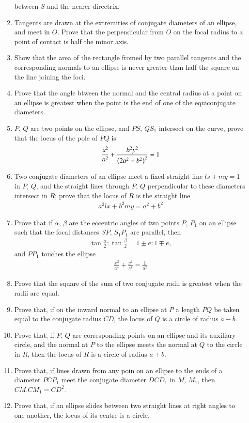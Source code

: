 \begin{enumerate}[label=\arabic*.,ref=\thesubsection.\theenumi]
between $S$ and the nearer directrix.
\item Tangents are drawn at the extremities of conjugate diameters of an ellipse, and meet in $O$.  Prove that the
perpendicular from $O$ on the focal radius to a point of contact is half the
minor axis.
\item Show that the area of the rectangle fromed by two parallel tangents and the corresponding
normals to an ellipse is never greater than half the square on the line joining the foci.
\item Prove that the angle btween the normal and the central radius at a point on an ellipse
is greatest when the point is the end of one of the equiconjugate diameters.
\item $P$, $Q$ are two points on the ellipse, and $PS$, $QS_1$ intersect on the curve, prove that the locus of the pole of $PQ$ is
\begin{align*}
\frac{x^2}{a^2}+\frac{b^2y^2}{\left(2a^2-b^2\right)^2} = 1
\end{align*}
\item Two conjugate diameters of an ellipse meet a fixed straight line $ls+my=1$ in $P$, $Q$, and the straight lines
through $P$, $Q$ perpendicular to these diameters intersect in $R$;  prove that the locus of
$R$ is the straight line
\begin{align*}
a^2lx + b^2my = a^2+b^2
\end{align*}
\item Prove that if $\alpha$, $\beta$ are the eccentric angles of two points $P$, $P_1$ on an ellipse such that
the focal distances $SP$, $S_1P_1$ are parallel, then 
\begin{align*}
\tan\frac{\alpha}{2}:\tan\frac{\beta}{2} = 1\pm e: 1\mp e,
\end{align*}
and $PP_1$ touches the ellipse
\begin{align*}
\frac{x^2}{a^4}+\frac{y^2}{b^4} = \frac{1}{a^2}
\end{align*}
\item Prove that the square of the sum of two conjugate radii is greatest when the radii are equal.
\item Prove that, if on the inward normal to an ellipse at $P$ a length $PQ$ be taken
equal to the conjugate radius $CD$, the locus of $Q$ is a circle of radius $a-b$.
\item Prove that, if $P$, $Q$ are corresponding points on an ellipse and its auxiliary circle, and the
normal at $P$ to the ellipse meets the normal at $Q$ to the circle in $R$, then the locus of $R$ is a circle of radius $a+b$.
\item Prove that, if lines drawn from any poin on an ellipse to the ends of a diameter $PCP_1$ meet the conjugate
diameter $DCD_1$ in $M$, $M_1$, then $CM.CM_1=CD^2$.
\item Prove that, if an ellipse slides between two straight lines
at right angles to one another, the locus of its centre is a circle.
\end{enumerate}
